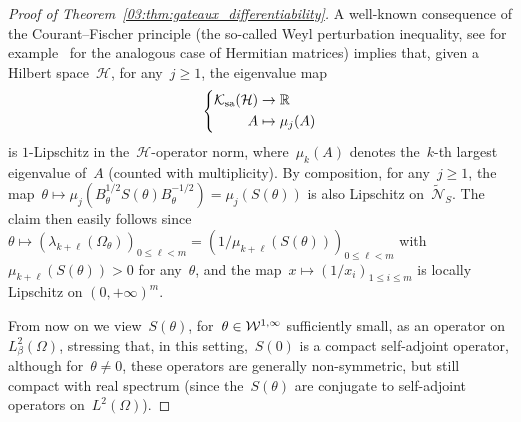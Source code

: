 \begin{proof}[Proof of Theorem~\ref{03:thm:gateaux_differentiability}]
    A well-known consequence of the Courant--Fischer principle (the so-called Weyl perturbation inequality, see for example~\cite[Section 1.3.3]{T12} for the analogous case of Hermitian matrices) implies that, given a Hilbert space~$\mathcal H$, for any~$j\geq 1$, the eigenvalue map
    \begin{equation}
        \left\{\begin{aligned} \mathcal K_{\mathrm{sa}}(\mathcal H)&\to \mathbb{R}\\
            A&\mapsto \mu_j(A)\end{aligned}\right.
    \end{equation}
    is $1$-Lipschitz in the~$\mathcal H$-operator norm, where~$\mu_k(A)$ denotes the~$k$-th largest eigenvalue of~$A$ (counted with multiplicity). By composition, for any~$j\geq 1$, the map~$\theta\mapsto \mu_j(B_\theta^{1/2}S(\theta)B_\theta^{-1/2}) = \mu_j(S(\theta))$ is also Lipschitz on~$\widetilde{\mathcal N}_S$.
    The claim then easily follows since~$\theta\mapsto\left(\lambda_{k+\ell}(\Omega_\theta)\right)_{0\leq \ell <m} = \left(1/\mu_{k+\ell}(S(\theta))\right)_{0\leq \ell <m}$ with~$\mu_{k+\ell}(S(\theta))>0$ for any~$\theta$, and the map~$x\mapsto \left(1/x_i\right)_{1\leq i\leq m}$ is locally Lipschitz on $\left(0,+\infty\right)^m$.
    
    From now on we view~$S(\theta)$, for~$\theta\in{\mathcal{W}}^{1,\infty}$ sufficiently small, as an operator on~$L_\beta^2(\Omega)$, stressing that, in this setting,~$S(0)$ is a compact self-adjoint operator, although for~$\theta\neq 0$, these operators are generally non-symmetric, but still compact with real spectrum (since the~$S(\theta)$ are conjugate to self-adjoint operators on~$L^2(\Omega)$).
    

\end{proof}
